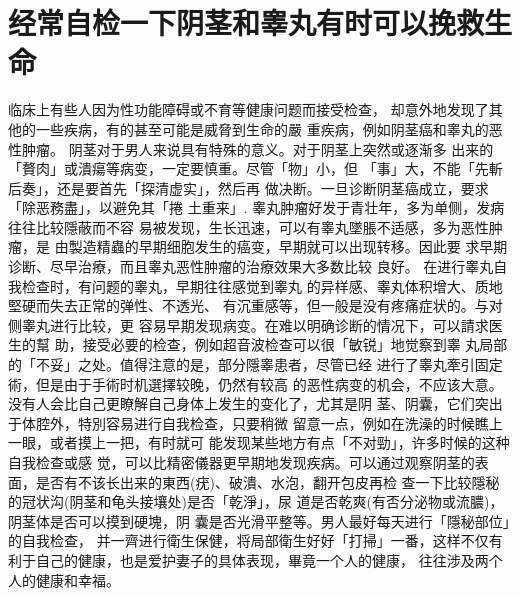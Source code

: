 \documentclass[12pt,UTF8]{ctexbook}
\begin{document}
\section{经常自检一下阴茎和睾丸有时可以挽救生命}

临床上有些人因为性功能障碍或不育等健康问题而接受检查，
却意外地发现了其他的一些疾病，有的甚至可能是威脅到生命的嚴
重疾病，例如阴茎癌和睾丸的恶性肿瘤。
阴茎对于男人来说具有特殊的意义。对于阴茎上突然或逐渐多
出来的「贅肉」或潰瘍等病变，一定要慎重。尽管「物」小，但
「事」大，不能「先斬后奏」，还是要首先「探清虚实」，然后再
做决断。一旦诊断阴茎癌成立，要求「除恶務盡」，以避免其「捲
土重来」.
睾丸肿瘤好发于青壮年，多为单侧，发病往往比较隱蔽而不容
易被发现，生长迅速，可以有睾丸墜脹不适感，多为恶性肿瘤，是
由製造精蟲的早期细胞发生的癌变，早期就可以出现转移。因此要
求早期诊断、尽早治療，而且睾丸恶性肿瘤的治療效果大多数比较
良好。
在进行睾丸自我检查时，有问题的睾丸，早期往往感觉到睾丸
的异样感、睾丸体积增大、质地堅硬而失去正常的弹性、不透光、
有沉重感等，但一般是没有疼痛症状的。与对侧睾丸进行比较，更
容易早期发现病变。在难以明确诊断的情况下，可以請求医生的幫
助，接受必要的检查，例如超音波检查可以很「敏锐」地觉察到睾
丸局部的「不妥」之处。值得注意的是，部分隱睾患者，尽管已经
进行了睾丸牽引固定術，但是由于手術时机選擇较晚，仍然有较高
的恶性病变的机会，不应该大意。
没有人会比自己更瞭解自己身体上发生的变化了，尤其是阴
茎、阴囊，它们突出于体腔外，特別容易进行自我检查，只要稍微
留意一点，例如在洗澡的时候瞧上一眼，或者摸上一把，有时就可
能发现某些地方有点「不对勁」，许多时候的这种自我检查或感
觉，可以比精密儀器更早期地发现疾病。可以通过观察阴茎的表
面，是否有不该长出来的東西(疣)、破潰、水泡，翻开包皮再检
查一下比较隱秘的冠状沟(阴茎和龟头接壤处)是否「乾淨」，尿
道是否乾爽(有否分泌物或流膿)，阴茎体是否可以摸到硬塊，阴
囊是否光滑平整等。男人最好每天进行「隱秘部位」的自我检查，
并一齊进行衛生保健，将局部衛生好好「打掃」一番，这样不仅有
利于自己的健康，也是爱护妻子的具体表现，畢竟一个人的健康，
往往涉及两个人的健康和幸福。
\end{document}
